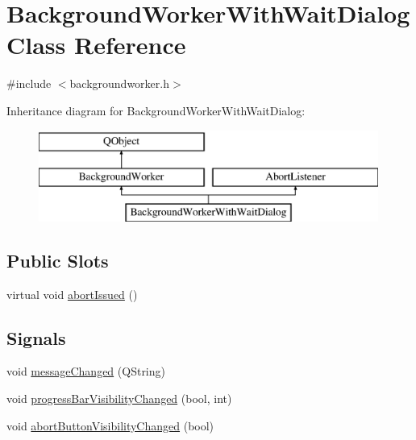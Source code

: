 \hypertarget{class_background_worker_with_wait_dialog}{}\section{Background\+Worker\+With\+Wait\+Dialog Class Reference}
\label{class_background_worker_with_wait_dialog}


{\ttfamily \#include $<$backgroundworker.\+h$>$}

Inheritance diagram for Background\+Worker\+With\+Wait\+Dialog\+:\begin{figure}[H]
\begin{center}
\leavevmode
\includegraphics[height=3.000000cm]{dd/dbe/class_background_worker_with_wait_dialog}
\end{center}
\end{figure}
\subsection*{Public Slots}
\begin{DoxyCompactItemize}
\item 
virtual void \mbox{\hyperlink{class_background_worker_with_wait_dialog_aba41bb3a047e51bd3be49d417b52487a}{abort\+Issued}} ()
\end{DoxyCompactItemize}
\subsection*{Signals}
\begin{DoxyCompactItemize}
\item 
void \mbox{\hyperlink{class_background_worker_with_wait_dialog_a1cb065d3520b46cd192a43030bf39b86}{message\+Changed}} (Q\+String)
\item 
void \mbox{\hyperlink{class_background_worker_with_wait_dialog_a8766030088825f435baa8399b7e40946}{progress\+Bar\+Visibility\+Changed}} (bool, int)
\item 
void \mbox{\hyperlink{class_background_worker_with_wait_dialog_afda7bce1f9251bd21587853d8d071a5a}{abort\+Button\+Visibility\+Changed}} (bool)
\end{DoxyCompactItemize}
